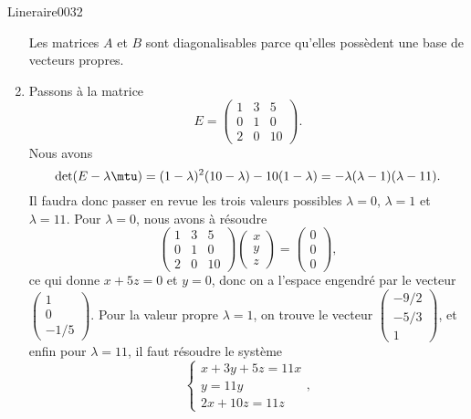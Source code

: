 \begin{corrige}{Lineraire0032}
\begin{enumerate}
	Les matrices $A$ et $B$ sont diagonalisables parce qu'elles possèdent une base de vecteurs propres.
\item
	Passons à la matrice
	\begin{equation}
		E=\begin{pmatrix}
			1	&	3	&	5	\\
			0	&	1	&	0	\\
			2	&	0	&	10
		\end{pmatrix}.
	\end{equation}
	Nous avons 
	\begin{equation}
		\det(E-\lambda\mtu)=(1-\lambda)^2(10-\lambda)-10(1-\lambda)=-\lambda(\lambda-1)(\lambda-11).
	\end{equation}
	Il faudra donc passer en revue les trois valeurs possibles $\lambda=0$, $\lambda=1$ et $\lambda=11$. Pour $\lambda=0$, nous avons à résoudre
	\begin{equation}
		\begin{pmatrix}
			1	&	3	&	5	\\
			0	&	1	&	0	\\
			2	&	0	&	10
		\end{pmatrix}\begin{pmatrix}
			x	\\ 
			y	\\ 
			z	
		\end{pmatrix}=\begin{pmatrix}
			0	\\ 
			0	\\ 
			0	
		\end{pmatrix},
	\end{equation}
	ce qui donne $x+5z=0$ et $y=0$, donc on a l'espace engendré par le vecteur $\begin{pmatrix}
		1	\\ 
		0	\\ 
		-1/5	
	\end{pmatrix}$. Pour la valeur propre $\lambda=1$, on trouve le vecteur $\begin{pmatrix}
		-9/2	\\ 
		-5/3	\\ 
		1	
	\end{pmatrix}$, et enfin pour $\lambda=11$, il faut résoudre le système
	\begin{equation}
		\begin{cases}
			x+3y+5z=11x\\
			y=11y\\
			2x+10z=11z
		\end{cases},
	\end{equation}

\end{enumerate}
\end{corrige}
